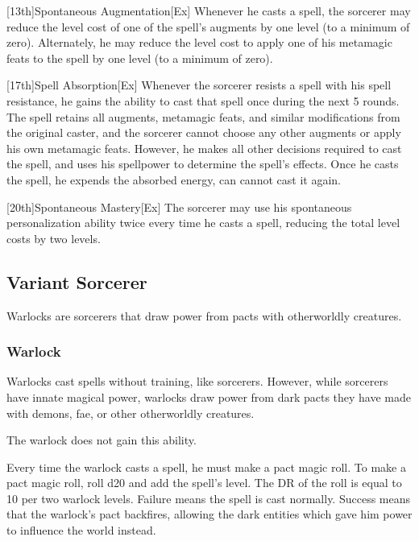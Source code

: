         [13th]{Spontaneous Augmentation}[Ex]
        Whenever he casts a spell, the sorcerer may reduce the level cost of one of the spell's augments by one level (to a minimum of zero).
        Alternately, he may reduce the level cost to apply one of his metamagic feats to the spell by one level (to a minimum of zero).

        [17th]{Spell Absorption}[Ex]
        Whenever the sorcerer resists a spell with his spell resistance, he gains the ability to cast that spell once during the next 5 rounds.
        The spell retains all augments, metamagic feats, and similar modifications from the original caster, and the sorcerer cannot choose any other augments or apply his own metamagic feats.
        However, he makes all other decisions required to cast the spell, and uses his spellpower to determine the spell's effects.
        Once he casts the spell, he expends the absorbed energy, can cannot cast it again.

        [20th]{Spontaneous Mastery}[Ex]
        The sorcerer may use his spontaneous personalization ability twice every time he casts a spell, reducing the total level costs by two levels.

    \subsection{Variant Sorcerer}

        Warlocks are sorcerers that draw power from pacts with otherworldly creatures.

        \subsubsection{Warlock}

            Warlocks cast spells without training, like sorcerers.
            However, while sorcerers have innate magical power, warlocks draw power from dark pacts they have made with demons, fae, or other otherworldly creatures.

             The warlock does not gain this ability.

             Every time the warlock casts a spell, he must make a pact magic roll.
            To make a pact magic roll, roll d20 and add the spell's level.
            The DR of the roll is equal to 10  per two warlock levels.
            Failure means the spell is cast normally.
            Success means that the warlock's pact backfires, allowing the dark entities which gave him power to influence the world instead.

